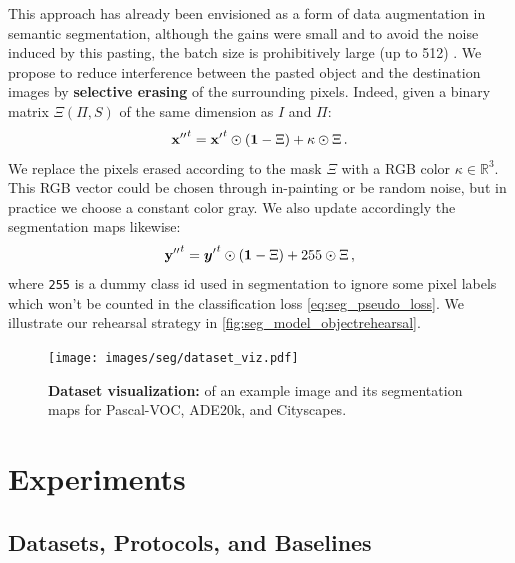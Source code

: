 This approach has already been envisioned as a form of data augmentation in semantic segmentation,
although the gains were small and to avoid the noise induced by this pasting, the batch size is
prohibitively large (up to 512) \citep{ghiasi2020simplecopypaste}. We propose to reduce interference
between the pasted object and the destination images by \textbf{selective erasing} of the
surrounding pixels. Indeed, given a binary matrix $\Xi(\Pi, S)$ of the same dimension as $I$ and
$\Pi$:
%
\begin{equation}
    {\mathbf{x}''}^t = {\mathbf{x}'}^t \odot (\mathbf{1} - \Xi) + \kappa \odot \Xi\,.
    \label{eq:seg_erasing_pixel}
\end{equation}
%
We replace the pixels erased according to the mask $\Xi$ with a RGB color $\kappa \in \mathbb{R}^3$.
This RGB vector could be chosen through in-painting \citep{fang2019instaboost} or be random noise,
but in practice we choose a constant color gray. We also update accordingly the segmentation maps
likewise:
%
\begin{equation}
    {\mathbf{y}''}^t = {{\bm{y}}'}^t \odot (\mathbf{1} - \Xi) + 255 \odot \Xi\,,
    \label{eq:seg_erasing_label}
\end{equation}
%
\noindent where \texttt{255} is a dummy class id used in segmentation to ignore some pixel labels
which won't be counted in the classification loss \autoref{eq:seg_pseudo_loss}. We illustrate our
rehearsal strategy in \autoref{fig:seg_model_objectrehearsal}.



\begin{figure}
    \centering
    \texttt{[image: images/seg/dataset\_viz.pdf]}
    \caption{\textbf{Dataset visualization:} of an example image and its segmentation maps for Pascal-VOC, ADE20k, and Cityscapes.}
    \label{fig:seg_dataset_viz}
\end{figure}



\section{Experiments}
\label{sec:seg_exp}

\subsection{Datasets, Protocols, and Baselines}
\label{sec:seg_datasets_protocols}

